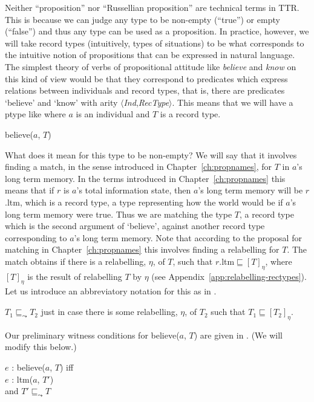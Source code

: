 Neither ``proposition'' nor ``Russellian proposition'' are technical
terms in TTR. This is because we can judge any type to be non-empty
(``true'') or empty (``false'') and thus any type can be used as a
proposition.  In practice, however, we will take record types
(intuitively, types of situations) to be what corresponds to the
intuitive notion of propositions that can be expressed in natural
language.  The simplest theory of verbs of propositional attitude like
\textit{believe} and \textit{know} on this kind of view would be that
they correspond to predicates which express relations between
individuals and record types, that is, there are predicates `believe'
and `know' with arity
$\langle$\textit{Ind},\textit{RecType}$\rangle$.  This means that we
will have a ptype like \nexteg{} where $a$ is an individual and $T$ is
a record type.
\begin{ex} 
believe($a$, $T$) 
\end{ex} 
What does it mean for this type to be non-empty?  We will say that it
involves finding a match, in the sense introduced in
Chapter~\ref{ch:propnames}, for $T$ in $a$'s long term memory. In the
terms introduced in Chapter~\ref{ch:propnames} this means that if $r$
is $a$'s total information state, then $a$'s long term memory will be
$r$.ltm, which is a record type, a type representing how the world
would be if $a$'s long term memory were true.  Thus we are matching
the type $T$, a record type which is the second argument of `believe',
against another record type corresponding to $a$'s long term memory.
Note that according to the proposal for matching in
Chapter~\ref{ch:propnames} this involves finding a relabelling for $T$.  The match obtains if there is
a relabelling, $\eta$, of $T$, such that
$r$.ltm$\sqsubseteq[T]_{\eta}$, where $[T]_{\eta}$ is the result of
relabelling $T$ by $\eta$ (see Appendix~\ref{app:relabelling-rectypes}). Let us introduce an
abbreviatory notation for this as in \nexteg{}.
\begin{ex} 
$T_1\sqsubseteq_{\leadsto}T_2$ just in case there is some relabelling,
$\eta$, of $T_2$ such that $T_1\sqsubseteq[T_2]_{\eta}$. 
\end{ex} 
  
Our preliminary witness conditions for believe($a$, $T$) are given in
\nexteg{}. (We will modify this below.)
\begin{ex} 
$e$ : believe($a$, $T$) iff\\
\hspace*{2em} $e$ : ltm($a$, $T'$) \\
\hspace*{2em} and $T'\sqsubseteq_{\leadsto}T$ 
\label{ex:believe-witcond-prelim}
\end{ex} 
   

